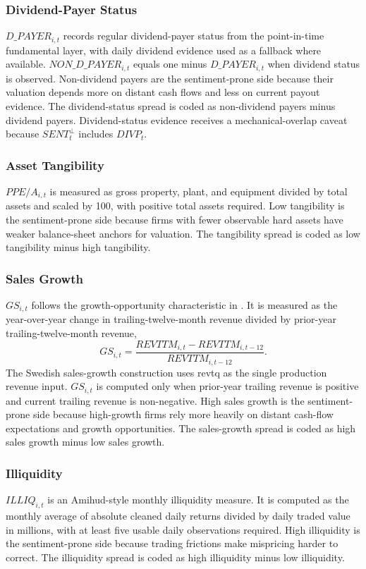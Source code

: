 \documentclass[11pt]{article}
\newcommand{\var}[1]{\ensuremath{#1}}
\newcommand{\repo}[1]{\textnormal{\small #1}}
\begin{document}
\subsubsection{Dividend-Payer Status}
\var{D\_PAYER_{i,t}} records regular dividend-payer status from the point-in-time fundamental layer, with daily dividend evidence used as a fallback where available. \var{NON\_D\_PAYER_{i,t}} equals one minus \var{D\_PAYER_{i,t}} when dividend status is observed. Non-dividend payers are the sentiment-prone side because their valuation depends more on distant cash flows and less on current payout evidence. The dividend-status spread is coded as non-dividend payers minus dividend payers. Dividend-status evidence receives a mechanical-overlap caveat because \var{SENT^{\perp}_{t}} includes \var{DIVP_t}.

\subsubsection{Asset Tangibility}
\var{PPE/A_{i,t}} is measured as gross property, plant, and equipment divided by total assets and scaled by 100, with positive total assets required. Low tangibility is the sentiment-prone side because firms with fewer observable hard assets have weaker balance-sheet anchors for valuation. The tangibility spread is coded as low tangibility minus high tangibility.

\subsubsection{Sales Growth}
\var{GS_{i,t}} follows the growth-opportunity characteristic in \citet{baker2006sentiment}. It is measured as the year-over-year change in trailing-twelve-month revenue divided by prior-year trailing-twelve-month revenue,
\begin{equation}
    GS_{i,t}
    =
    \frac{\var{REVTTM}_{i,t} - \var{REVTTM}_{i,t-12}}{\var{REVTTM}_{i,t-12}}.
\end{equation}
The Swedish sales-growth construction uses \repo{revtq} as the single production revenue input. \var{GS_{i,t}} is computed only when prior-year trailing revenue is positive and current trailing revenue is non-negative. High sales growth is the sentiment-prone side because high-growth firms rely more heavily on distant cash-flow expectations and growth opportunities. The sales-growth spread is coded as high sales growth minus low sales growth.

\subsubsection{Illiquidity}
\var{ILLIQ_{i,t}} is an Amihud-style monthly illiquidity measure. It is computed as the monthly average of absolute cleaned daily returns divided by daily traded value in millions, with at least five usable daily observations required. High illiquidity is the sentiment-prone side because trading frictions make mispricing harder to correct. The illiquidity spread is coded as high illiquidity minus low illiquidity.
\end{document}

